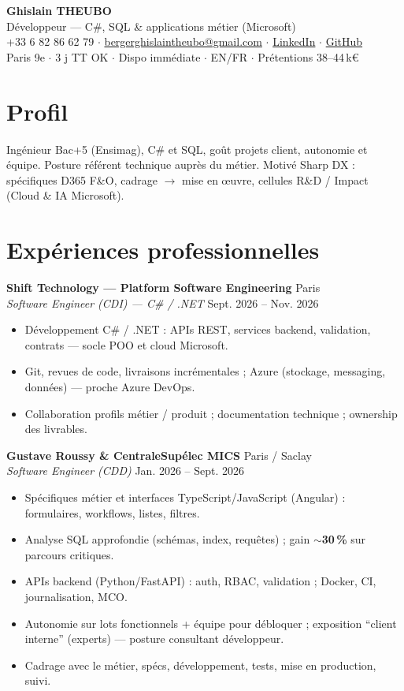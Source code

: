\documentclass[10pt,a4paper]{article}
\begin{document}
\begin{center}
{\LARGE\bfseries Ghislain THEUBO}\\[1pt]
{\large D\'eveloppeur --- C\#, SQL \& applications m\'etier (Microsoft)}\\[2pt]
+33 6 82 86 62 79 $\cdot$
\href{mailto:bergerghislaintheubo@gmail.com}{bergerghislaintheubo@gmail.com} $\cdot$
\href{https://www.linkedin.com/in/berger-ghislain}{LinkedIn} $\cdot$
\href{https://github.com/Bergerghislain}{GitHub}\\[1pt]
Paris 9e $\cdot$ 3 j TT OK $\cdot$ Dispo imm\'ediate $\cdot$ EN/FR $\cdot$ Pr\'etentions 38--44\,k€
\end{center}

\section{Profil}
Ing\'enieur Bac+5 (Ensimag), C\# et SQL, go\^ut projets client, autonomie et \'equipe. Posture r\'ef\'erent technique aupr\`es du m\'etier. Motiv\'e Sharp DX : sp\'ecifiques D365 F\&O, cadrage $\rightarrow$ mise en œuvre, cellules R\&D / Impact (Cloud \& IA Microsoft).

\section{Exp\'eriences professionnelles}
\textbf{Shift Technology --- Platform Software Engineering} \hfill Paris\\
\textit{Software Engineer (CDI) --- C\# / .NET} \hfill Sept. 2026 -- Nov. 2026
\begin{itemize}
  \item D\'eveloppement C\# / .NET : APIs REST, services backend, validation, contrats --- socle POO et cloud Microsoft.
  \item Git, revues de code, livraisons incr\'ementales ; Azure (stockage, messaging, donn\'ees) --- proche Azure DevOps.
  \item Collaboration profils m\'etier / produit ; documentation technique ; ownership des livrables.
\end{itemize}

\textbf{Gustave Roussy \& CentraleSup\'elec MICS} \hfill Paris / Saclay\\
\textit{Software Engineer (CDD)} \hfill Jan. 2026 -- Sept. 2026
\begin{itemize}
  \item Sp\'ecifiques m\'etier et interfaces TypeScript/JavaScript (Angular) : formulaires, workflows, listes, filtres.
  \item Analyse SQL approfondie (sch\'emas, index, requ\^etes) ; gain $\sim$\textbf{30\,\%} sur parcours critiques.
  \item APIs backend (Python/FastAPI) : auth, RBAC, validation ; Docker, CI, journalisation, MCO.
  \item Autonomie sur lots fonctionnels + \'equipe pour d\'ebloquer ; exposition ``client interne'' (experts) --- posture consultant d\'eveloppeur.
  \item Cadrage avec le m\'etier, sp\'ecs, d\'eveloppement, tests, mise en production, suivi.
\end{itemize}
\end{document}
